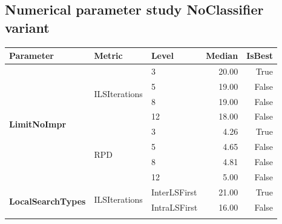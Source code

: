 \subsection{Numerical parameter study NoClassifier variant}
\begin{table}[!ht]
	\scriptsize
	\centering
	\renewcommand{\multirowsetup}{\centering}
	\begin{tabular}{l l l r r}
		\toprule
		\textbf{Parameter}                             & \textbf{Metric}                   & \textbf{Level}        & \textbf{Median} & \textbf{IsBest} \\
		\midrule
		\multirow[t]{8}{*}{\textbf{LimitNoImpr}}       & \multirow[t]{4}{*}{ILSIterations} & 3                     & 20.00           & True            \\\cmidrule(lr){3-5}
		                                               &                                   & 5                     & 19.00           & False           \\\cmidrule(lr){3-5}
		                                               &                                   & 8                     & 19.00           & False           \\\cmidrule(lr){3-5}
		                                               &                                   & 12                    & 18.00           & False           \\\cmidrule(lr){2-5}
		                                               & \multirow[t]{4}{*}{RPD}           & 3                     & 4.26            & True            \\\cmidrule(lr){3-5}
		                                               &                                   & 5                     & 4.65            & False           \\\cmidrule(lr){3-5}
		                                               &                                   & 8                     & 4.81            & False           \\\cmidrule(lr){3-5}
		                                               &                                   & 12                    & 5.00            & False           \\\midrule
		\multirow[t]{4}{*}{\textbf{LocalSearchTypes}}  & \multirow[t]{2}{*}{ILSIterations} & InterLSFirst          & 21.00           & True            \\\cmidrule(lr){3-5}
		                                               &                                   & IntraLSFirst          & 16.00           & False           \\\cmidrule(lr){2-5}

\end{tabular}
\end{table}
